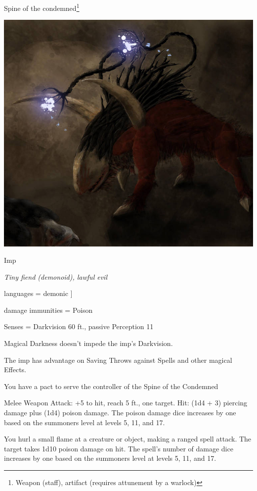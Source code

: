 \begin{commentbox}{Spine of the condemned\footnote{Weapon (staff), artifact (requires attunement by a warlock)}}
\begin{center}
		\includegraphics[width=0.365\linewidth]{img/WoW/felhunterart.jpg}
	\end{center}
\end{commentbox}

\begin{monsterbox}{Imp}
	\begin{hangingpar}
		\textit{Tiny fiend (demonoid), lawful evil}
	\end{hangingpar}
	\dndline%
	\basics[armorclass = 13, hitpoints = 10 + summoners level, speed = 20 ft]
	\dndline%
	\stats[STR = \stat{6}, DEX = \stat{17}, CON = \stat{13}, INT = \stat{11}, WIS = \stat{12},	CHA = \stat{14}]
	\dndline
	languages = {demonic}
	]
	
	\dndline%
	damage immunities = Poison
		
	Senses = Darkvision 60 ft., passive Perception 11
	
	\dndline%
	\begin{monsteraction}
		Magical Darkness doesn't impede the imp's Darkvision.
	\end{monsteraction}	
	\begin{monsteraction}
		The imp has advantage on Saving Throws against Spells and other magical Effects.
	\end{monsteraction}	
	\begin{monsteraction}
		You have a pact to serve the controller of the Spine of the Condemned
	\end{monsteraction}	
	\begin{monsteraction}
		Melee Weapon Attack: +5 to hit, reach 5 ft., one target. Hit: (1d4 + 3) piercing damage plus (1d4) poison damage. The poison damage dice increases by one based on the summoners level at levels 5, 11, and 17.
	\end{monsteraction}	
	\begin{monsteraction}
		You hurl a small flame at a creature or object, making a ranged spell attack. The target takes 1d10 poison damage on hit. The spell's number of damage dice increases by one based on the summoners level at levels 5, 11, and 17.
	\end{monsteraction}	
\end{monsterbox}

